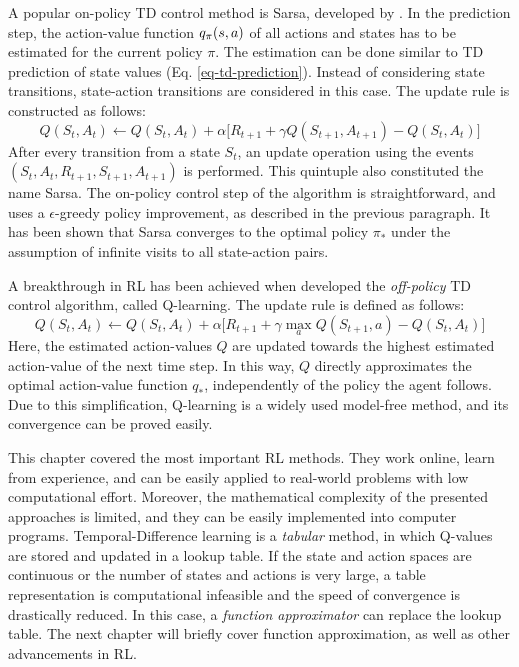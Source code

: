 \documentclass[a4paper, 12pt]{article}
\let\textcite\shortciteA
\begin{document}
A popular on-policy TD control method is Sarsa, developed by
\textcite{rummery94_q}. In the prediction step, the action-value function
\(q_\pi(s,a)\) of all actions and states has to be estimated for the current
policy \(\pi\). The estimation can be done similar to TD prediction of state
values (Eq. \ref{eq-td-prediction}). Instead of considering state transitions,
state-action transitions are considered in this case. The update rule is
constructed as follows:
\begin{equation}
    Q(S_t, A_t) \leftarrow Q(S_t,A_t) + \alpha\big[R_{t+1}+\gamma Q(S_{t+1},A_{t+1}) - Q(S_t, A_t)\big]
\end{equation}
After every transition from a state \(S_t\), an update operation using the events
\((S_t, A_t, R_{t+1}, S_{t+1}, A_{t+1})\) is performed. This quintuple also
constituted the name Sarsa. The on-policy control step of the algorithm is
straightforward, and uses a \(\epsilon\)-greedy policy improvement, as described in
the previous paragraph. It has been shown that Sarsa converges to the optimal
policy \(\pi_*\) under the assumption of infinite visits to all state-action
pairs.

A breakthrough in RL has been achieved when \textcite{watkins92_q_learn} developed
the \emph{off-policy} TD control algorithm, called Q-learning. The update rule is
defined as follows:
\begin{equation}
    Q(S_t, A_t) \leftarrow Q(S_t,A_t) + \alpha\big[R_{t+1}+\gamma\max_a Q(S_{t+1},a) - Q(S_t, A_t)\big]
\end{equation}
Here, the estimated action-values \(Q\) are updated towards the highest estimated
action-value of the next time step. In this way, \(Q\) directly approximates the
optimal action-value function \(q_*\), independently of the policy the agent
follows. Due to this simplification, Q-learning is a widely used model-free
method, and its convergence can be proved easily.


This chapter covered the most important RL methods. They work online, learn from
experience, and can be easily applied to real-world problems with low
computational effort. Moreover, the mathematical complexity of the presented
approaches is limited, and they can be easily implemented into computer
programs. Temporal-Difference learning is a \emph{tabular} method, in which Q-values
are stored and updated in a lookup table. If the state and action spaces are
continuous or the number of states and actions is very large, a table
representation is computational infeasible and the speed of convergence is
drastically reduced. In this case, a \emph{function approximator} can replace the
lookup table. The next chapter will briefly cover function approximation, as
well as other advancements in RL.
\end{document}

